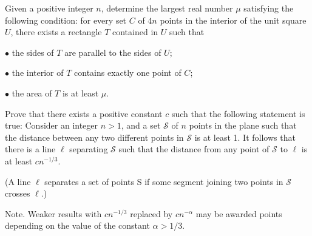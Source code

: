 \documentclass[11pt]{scrartcl}
\begin{document}
\begin{problem} %
    Given a positive integer $n$, determine the largest real number $\mu$ satisfying the following condition: for every set $C$ of $4n$ points in the interior of the unit square $U$, there exists a rectangle $T$ contained in $U$ such that

$\bullet$ the sides of $T$ are parallel to the sides of $U$;

$\bullet$ the interior of $T$ contains exactly one point of $C$;

$\bullet$ the area of $T$ is at least $\mu$.
\end{problem}

\begin{problem} %
    Prove that there exists a positive constant $c$ such that the following statement is true:
Consider an integer $n > 1$, and a set $\mathcal S$ of $n$ points in the plane such that the distance between any two different points in $\mathcal S$ is at least 1. It follows that there is a line $\ell$ separating $\mathcal S$ such that the distance from any point of $\mathcal S$ to $\ell$ is at least $cn^{-1/3}$.

(A line $\ell$ separates a set of points S if some segment joining two points in $\mathcal S$ crosses $\ell$.)

Note. Weaker results with $cn^{-1/3}$ replaced by $cn^{-\alpha}$ may be awarded points depending on the value of the constant $\alpha > 1/3$.
\end{problem}
\end{document}
